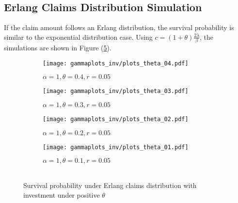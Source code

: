 \documentclass[12pt]{article}
\begin{document}
\subsection{Erlang Claims Distribution Simulation}
If the claim amount follows an Erlang distribution, the survival probability is similar to the exponential distribution case. Using \(c=(1+\theta)\frac{2\lambda}{\beta}\), the simulations are shown in Figure (\ref{fig:image6}).
\begin{figure}[!htbp]
\begin{subfigure}{0.5\textwidth}
\texttt{[image: gammaplots\_inv/plots\_theta\_04.pdf]} 
\caption{\(\alpha=1, \theta=0.4, r=0.05\)}
\label{gamma_inv_theta04}
\end{subfigure}
\begin{subfigure}{0.5\textwidth}
\texttt{[image: gammaplots\_inv/plots\_theta\_03.pdf]} 
\caption{\(\alpha=1, \theta=0.3, r=0.05\)}
\label{gamma_inv_theta03}
\end{subfigure}
\begin{subfigure}{0.5\textwidth}
\texttt{[image: gammaplots\_inv/plots\_theta\_02.pdf]} 
\caption{\(\alpha=1, \theta=0.2, r=0.05\)}
\label{gamma_inv_theta02}
\end{subfigure}
\begin{subfigure}{0.5\textwidth}
\texttt{[image: gammaplots\_inv/plots\_theta\_01.pdf]} 
\caption{\(\alpha=1, \theta=0.1, r=0.05\)}
\label{gamma_inv_theta01}
\end{subfigure}
\caption{\\Survival probability under Erlang claims distribution with investment under positive \(\theta\)}
\label{fig:image6}
\end{figure}
\end{document}
